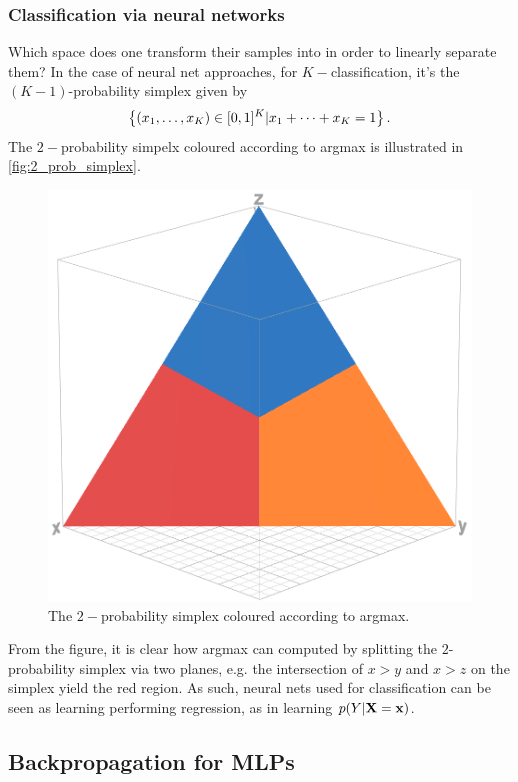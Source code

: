 \documentclass[11pt]{article}
\begin{document}
\subsubsection{Classification via neural networks}
Which space does one transform their samples into in order to linearly separate them? In the case of neural net approaches, for $K-$classification, it's the $(K-1)$-probability simplex given by
$$
\left\{(x_1,\dots,x_K)\in[0,1]^K|x_1+\dots+x_K=1\right\}.
$$
The $2-$probability simpelx coloured according to argmax is illustrated in \autoref{fig:2_prob_simplex}.
\begin{figure}[t]
    \centering
    \includegraphics[width=1\textwidth]{./figures/neural_nets/MLP_simplex_argmax.png}
    \caption{The $2-$probability simplex coloured according to argmax.}
    \label{fig:2_prob_simplex}
\end{figure}
From the figure, it is clear how argmax can computed by splitting the $2$-probability simplex via two planes, e.g. the intersection of $x>y$ and $x>z$ on the simplex yield the red region. As such, neural nets used for classification can be seen as learning performing regression, as in learning $p(Y|\mathbf{X}=\mathbf{x})$.

\subsection{Backpropagation for MLPs}
\label{subsec:backprop}
\end{document}
